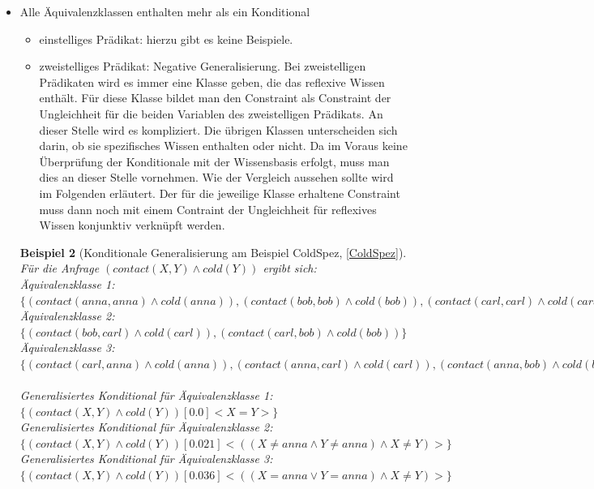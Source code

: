 \documentclass[a4paper, 11pt]{book}
\newtheorem{Bsp}{Beispiel}[section]
\begin{document}
\begin{itemize}
\begin{itemize}
\begin{Bsp}[Konditionale Generalisierung am Beispiel Birds3Classes, \ref{Birds3Classes}]
		\end{Bsp}
		\item zweistelliges Prädikat:\\	
		Dieser Fall kommt nicht vor, da die Klassen bei zweistelligen Prädikaten mindestens zwei Element enthalten.	
	\end{itemize}
	\item Alle Äquivalenzklassen enthalten mehr als ein Konditional
	\begin{itemize}
		\item einstelliges Prädikat: hierzu gibt es keine Beispiele.
		\item zweistelliges Prädikat: Negative Generalisierung. Bei zweistelligen Prädikaten wird es immer eine Klasse geben, die das reflexive Wissen enthält. Für diese Klasse bildet man den Constraint als Constraint der Ungleichheit für die beiden Variablen des zweistelligen Prädikats. An dieser Stelle wird es kompliziert. Die übrigen Klassen unterscheiden sich darin, ob sie spezifisches Wissen enthalten oder nicht. Da im Voraus keine Überprüfung der Konditionale mit der Wissensbasis erfolgt, muss man dies an dieser Stelle vornehmen. Wie der Vergleich aussehen sollte wird im Folgenden erläutert. Der für die jeweilige Klasse erhaltene Constraint muss dann noch mit einem Contraint der Ungleichheit für reflexives Wissen konjunktiv verknüpft werden. 
		\end{itemize}


		\begin{Bsp}[Konditionale Generalisierung am Beispiel ColdSpez, \ref{ColdSpez}]
			Für die Anfrage $ (contact(X,Y) \land cold(Y)) $ ergibt sich:\\
			Äquivalenzklasse 1: $ \{(contact(anna,anna) \land cold(anna)), (contact(bob,bob) \land cold(bob)), (contact(carl,carl) \land cold(carl)) \} $\\
			Äquivalenzklasse 2: $ \{(contact(bob,carl) \land cold(carl)), (contact(carl,bob) \land cold(bob)) \} $\\
			Äquivalenzklasse 3: $ \{(contact(carl,anna) \land cold(anna)), (contact(anna, carl) \land cold(carl)), (contact(anna,bob) \land cold(bob)), (contact(bob, anna) \land cold(anna)) \} $\\
			\\
			\noindent
			Generalisiertes Konditional für Äquivalenzklasse 1: $ \{(contact(X,Y) \land cold(Y)) [0.0] <X = Y>\} $\\
			Generalisiertes Konditional für Äquivalenzklasse 2: $ \{(contact(X,Y) \land cold(Y)) [0.021] <((X \neq anna \land Y \neq anna) \land X \neq Y)>\} $\\
			Generalisiertes Konditional für Äquivalenzklasse 3: $ \{(contact(X,Y) \land cold(Y)) [0.036] <((X = anna \lor Y = anna)\land X \neq Y)>\} $	
		\end{Bsp}
	
\end{itemize}
\end{document}
